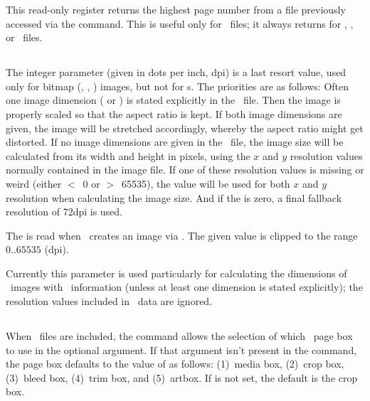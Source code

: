 \documentclass{pdftexmanual}
\begin{document}
This read-only register returns the highest page number from a file
previously accessed via the  command.
This is useful only for \PDF\ files; it always returns 
for \PNG, \JPEG, or \JBIGTWO\ files.

\subsection{}

The integer  parameter (given in dots per inch,
dpi) is a last resort value, used only for bitmap (\JPEG, \PNG,
\JBIGTWO) images, but not for \PDF{}s. The priorities are as follows:
Often one image dimension ( or ) is stated
explicitly in the \TEX\ file. Then the image is properly scaled so that
the aspect ratio is kept. If both image dimensions are given, the image
will be stretched accordingly, whereby the aspect ratio might get
distorted. If no image dimensions are given in the \TEX\ file, the image
size will be calculated from its width and height in pixels, using the
$x$ and $y$ resolution values normally contained in the image file. If
one of these resolution values is missing or weird (either $<$~0 or
$>$~65535), the  value will be used for both $x$
and $y$ resolution when calculating the image size. And if the
 is zero, a final fallback resolution of 72dpi is
used.

The  is read when \PDFTEX\ creates an image via
. The given value is clipped to the range $0..65535$
(dpi).

Currently this parameter is used particularly for calculating the
dimensions of \JPEG\ images with \EXIF\ information (unless at least one
dimension is stated explicitly); the resolution values included in
\EXIF\ data are ignored.

\subsection{}

When \PDF\ files are included, the command  allows the
selection of which \PDF\ page box to use in the optional  argument. If that argument isn't present in the command, the
page box defaults to the value of  as follows: (1)~media
box, (2)~crop box, (3)~bleed box, (4)~trim box, and (5)~artbox.  If
 is not set, the default is the crop box.
\end{document}
